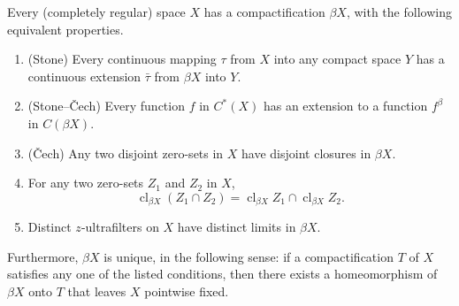 Every (completely regular) space $X$ has a compactification $\beta X$, with the following equivalent properties.

\begin{enumerate}
\item[(I)] (Stone) Every continuous mapping $\tau$ from $X$ into any compact space $Y$ has a continuous extension $\bar{\tau}$ from $\beta X$ into $Y$.
\item[(II)] (Stone--\v{C}ech) Every function $f$ in $C^*(X)$ has an extension to a function $f^\beta$ in $C(\beta X)$.
\item[(III)] (\v{C}ech) Any two disjoint zero-sets in $X$ have disjoint closures in $\beta X$.
\item[(IV)] For any two zero-sets $Z_1$ and $Z_2$ in $X$,
$$\operatorname{cl}_{\beta X}(Z_1 \cap Z_2) = \operatorname{cl}_{\beta X} Z_1 \cap \operatorname{cl}_{\beta X} Z_2.$$
\item[(V)] Distinct $z$-ultrafilters on $X$ have distinct limits in $\beta X$.
\end{enumerate}

Furthermore, $\beta X$ is unique, in the following sense: if a compactification $T$ of $X$ satisfies any one of the listed conditions, then there exists a homeomorphism of $\beta X$ onto $T$ that leaves $X$ pointwise fixed.
